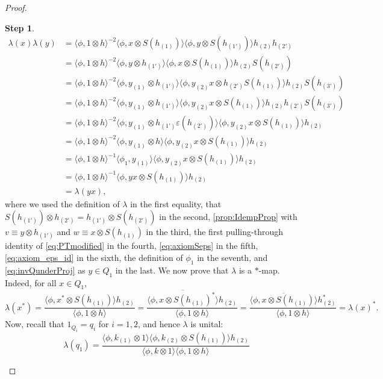 \documentclass[a4paper,10pt]{amsart}
\newcommand{\eval}[2]{\langle #1 , #2\rangle}
\theoremstyle{definition}
\newtheorem{step-goursat}{Step}
\begin{document}
\begin{proof}
\begin{step-goursat}
\begin{align*}
        \lambda(x)\lambda(y)
        &=\eval{\phi}{1\otimes h}^{-2}\eval{\phi}{x \otimes S(h_{(1)})} \eval{\phi}{y \otimes S(h_{(1')})} h_{(2)}h_{(2')}\\
        &=\eval{\phi}{1\otimes h}^{-2} \eval{\phi}{y \otimes h_{(1')}} \eval{\phi}{x \otimes S(h_{(1)})} h_{(2)}S(h_{(2')})\\
        &=\eval{\phi}{1\otimes h}^{-2} \eval{\phi}{y_{(1)} \otimes h_{(1')}} \eval{\phi}{y_{(2)} x \otimes h_{(2')} S(h_{(1)})} h_{(2)}S(h_{(3')})\\
        &=\eval{\phi}{1\otimes h}^{-2} \eval{\phi}{y_{(1)} \otimes h_{(1')}} \eval{\phi}{y_{(2)} x \otimes S(h_{(1)})} h_{(2)}h_{(2')}S(h_{(3')})\\
        &=\eval{\phi}{1\otimes h}^{-2} \eval{\phi}{y_{(1)} \otimes h_{(1')} \varepsilon(h_{(2')})} \eval{\phi}{y_{(2)} x \otimes S(h_{(1)})} h_{(2)}\\
        &=\eval{\phi}{1\otimes h}^{-2} \eval{\phi}{y_{(1)} \otimes h} \eval{\phi}{y_{(2)} x \otimes S(h_{(1)})} h_{(2)}\\
        &=\eval{\phi}{1\otimes h}^{-1} \eval{\phi_1}{y_{(1)}} \eval{\phi}{y_{(2)} x \otimes S(h_{(1)})} h_{(2)}\\
        &=\eval{\phi}{1\otimes h}^{-1} \eval{\phi}{yx \otimes S(h_{(1)})} h_{(2)}\\
        &=\lambda(yx),
    \end{align*}
    where we used the definition of $\lambda$ in the first equality,  that $S(h_{(1')})\otimes h_{(2')}= h_{(1')}\otimes S(h_{(2')})$ in the second, \cref{prop:IdempProp} with $v\equiv y\otimes h_{(1')}$ and $w\equiv x\otimes S(h_{(1)})$ in the third, the first pulling-through identity of \cref{eq:PTmodified} in the fourth, \cref{eq:axiomSeps} in the fifth, \cref{eq:axiom_eps_id} in the sixth, the definition of $\phi_1$ in the seventh, and \cref{eq:invQunderProj} as $y\in Q_1$ in the last.
    \smallbreak\noindent%
    We now prove that $\lambda$ is a $*$-map. Indeed, for all $x\in Q_1$, 
    \[
        \lambda(x^*)
        =
        \frac{\eval{\phi}{x^*\otimes S(h_{(1)})}h_{(2)}}{\eval{\phi}{1 \otimes h}}
        =
        \frac{\overline{\eval{\phi}{x\otimes S(h_{(1)})^*}}h_{(2)}}{\eval{\phi}{1 \otimes h}}
        =
        \frac{\overline{\eval{\phi}{x\otimes S(h_{(1)})}}h_{(2)}^*}{\eval{\phi}{1 \otimes h}}
        =
        \lambda(x)^*.
    \]
    \smallbreak\noindent%
    Now, recall that $1_{Q_i}=q_i$ for $i=1,2$, and hence $\lambda$ is unital:
    \[
        \lambda(q_1)
        = \frac{\eval{\phi}{k_{(1)}\otimes 1}\eval{\phi}{k_{(2)}\otimes S(h_{(1)})}h_{(2)}}{\eval{\phi}{k\otimes 1} \eval{\phi}{1 \otimes h}}
\]
\end{step-goursat}
\end{proof}
\end{document}
